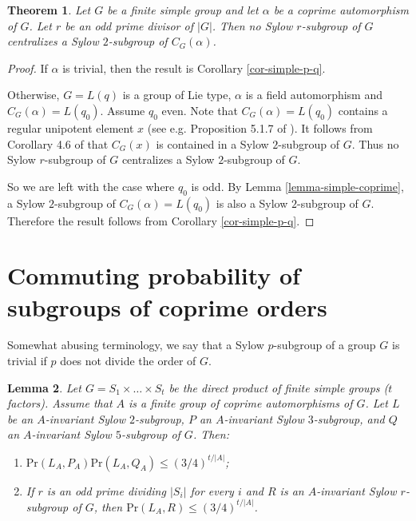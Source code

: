 \documentclass[12pt]{amsart}
\newtheorem{theorem}{\bf Theorem}[section]
\newtheorem{lemma}[theorem]{\bf Lemma}
\newcommand{\al }{\alpha }
\newcommand{\pr }{\mathrm{Pr} }
\newcommand{\LL }{L }
\newcommand{\comment}[1]{{\color{blue}\rule[-0.5ex]{2pt}{2.5ex}}\marginpar{\small\begin{flushleft}\color{blue}#1\end{flushleft}}}
\begin{document}
\begin{theorem}\label{thm-simple-coprime} Let $G$ be a finite simple group and let  $\alpha$ be   a coprime automorphism of $G$.
 Let $r$ be an odd prime divisor of $|G|$. Then no Sylow $r$-subgroup of $G$ centralizes a Sylow $2$-subgroup of $C_G(\alpha)$. 
\end{theorem}
\begin{proof} 
If $\al$ is trivial, then the result is Corollary \ref{cor-simple-p-q}. 

Otherwise, $G = L(q)$ is a group of Lie type, $\alpha$ is a field automorphism and $C_G(\alpha) = L(q_0)$.  
Assume $q_0$ even. 
Note that  $C_G(\alpha) =L(q_0)$ contains a regular unipotent element $x$ (see e.g. Proposition 5.1.7 of \cite{Carter2}).
 It follows from Corollary 4.6 of \cite{Hum} that $C_G(x)$ is contained in a   Sylow $2$-subgroup of $G$. 
 Thus no Sylow $r$-subgroup of $G$  centralizes a   Sylow $2$-subgroup of $G$. 
  
 So we are left with the case where $q_0$ is odd. By Lemma \ref{lemma-simple-coprime}, 
  a Sylow $2$-subgroup of $C_G(\al)=L(q_0)$ is also a Sylow $2$-subgroup of $G$. Therefore the result follows from  Corollary \ref{cor-simple-p-q}. 
\end{proof}

\section{Commuting probability of subgroups of coprime orders}\label{tres}  

Somewhat abusing terminology, we say that a Sylow $p$-subgroup of a group $G$ is trivial if $p$ does not divide the order of $G$. 


\begin{lemma}\label{product_prob}
  Let $G=S_1\times\dots\times S_t$ be the direct product of finite simple groups ($t$ factors). 
Assume that $A$ is a finite group of coprime automorphisms of $G$. Let $\LL$ be an $A$-invariant Sylow $2$-subgroup, $P$ an $A$-invariant Sylow $3$-subgroup, and $Q$ an $A$-invariant Sylow $5$-subgroup  of $G$. 
 Then: 
\begin{enumerate}
\item  $\pr (\LL_A ,P_A) \pr(\LL_A ,Q_A) \le (3/4)^{t/|A|} $;
\item  If $r$ is an odd prime dividing $|S_i|$ for every $i$ and $R$ is an $A$-invariant Sylow $r$-subgroup  of $G$,  then $\pr (\LL_A,R)  \le (3/4)^{t/|A|}$.
\end{enumerate}
 \end{lemma}
\end{document}

